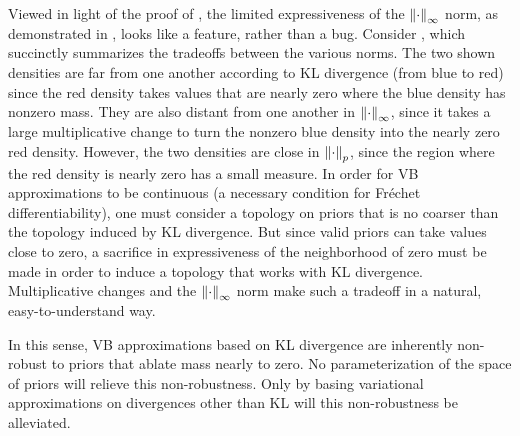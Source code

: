 Viewed in light of the proof of , the limited
expressiveness of the $\left\Vert\cdot\right\Vert_{\infty}$ norm, as demonstrated in
, looks like a feature, rather than a bug.
Consider , which succinctly summarizes the tradeoffs between
the various norms.  The two shown densities are far from one another according
to KL divergence (from blue to red) since the red density takes values that are
nearly zero where the blue density has nonzero mass. They are also distant from
one another in $\left\Vert\cdot\right\Vert_{\infty}$, since it takes a large multiplicative change
to turn the nonzero blue density into the nearly zero red density. However, the
two densities are close in $\left\Vert\cdot\right\Vert_{p}$, since the region where the red
density is nearly zero has a small measure. In order for VB approximations to be
continuous (a necessary condition for Fr{\'e}chet differentiability), one must
consider a topology on priors that is no coarser than the topology induced by KL
divergence.  But since valid priors can take values close to zero, a sacrifice
in expressiveness of the neighborhood of zero must be made in order to induce a
topology that works with KL divergence. Multiplicative changes and the
$\left\Vert\cdot\right\Vert_{\infty}$ norm make such a tradeoff in a natural, easy-to-understand
way.

In this sense, VB approximations based on KL divergence are inherently
non-robust to priors that ablate mass nearly to zero.  No parameterization of
the space of priors will relieve this non-robustness.  Only by basing
variational approximations on divergences other than KL will this non-robustness
be alleviated.

\FunctionDistFig{}
